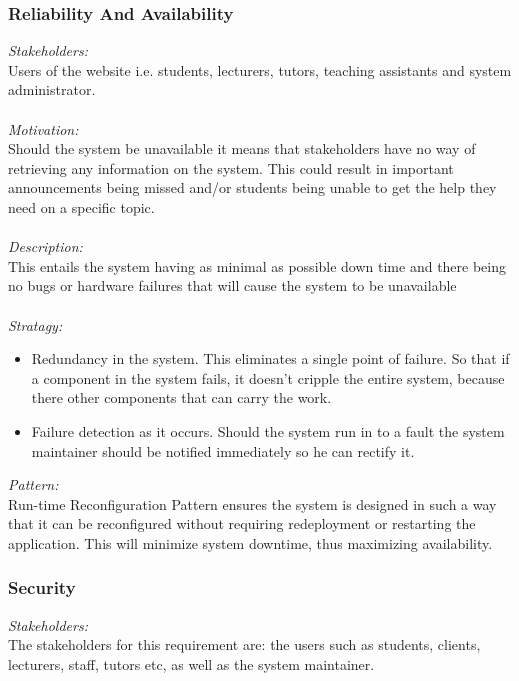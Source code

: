 \documentclass[a4paper,12pt]{report}
\begin{document}
		\subsubsection{Reliability And Availability}
		\emph{Stakeholders: }\\ Users of the website i.e. students, lecturers, tutors, teaching assistants and system administrator. \\
		\\\emph{Motivation: }\\ Should the system be unavailable it means that stakeholders have no way of retrieving any information on the system. This could result in important announcements being missed and/or students being unable to get the help they need on a specific topic. \\
		\\\emph{Description: }\\ This entails the system having as minimal as possible down time and there being no bugs or hardware failures that will cause the system to be unavailable \\
		\\\emph{Stratagy: }\\
		\begin{itemize}
		\item Redundancy in the system. This eliminates a single point of failure. So that if a component in the system fails, it doesn’t cripple the entire system, because there other components that can carry the work.
		
		\item Failure detection as it occurs. Should the system run in to a fault the system maintainer should be notified immediately so he can rectify it. 
		\end{itemize}
		
		\emph{Pattern: }\\ Run-time Reconfiguration Pattern ensures the system is designed in such a way that it can be reconfigured without requiring redeployment or restarting the application. This will minimize system downtime, thus maximizing availability.
			
		\subsubsection{Security}
		\emph{Stakeholders: }\\ The stakeholders for this requirement are: the users such as students, clients, lecturers, staff, tutors etc,  as well as the system maintainer.\\
		
\end{document}
